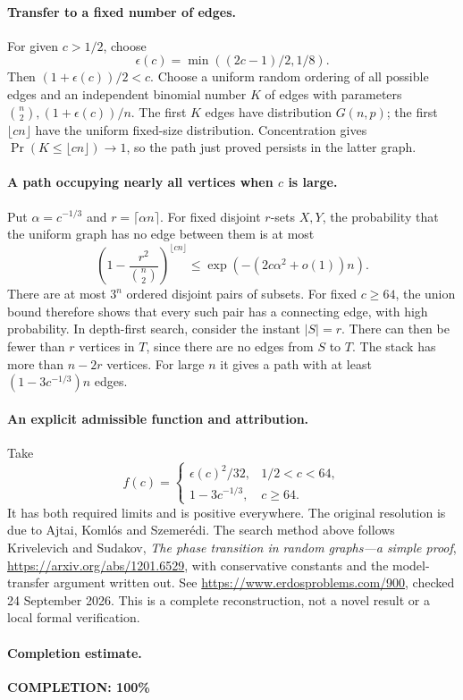 \paragraph{Transfer to a fixed number of edges.}
For given \(c>1/2\), choose
\[
 \epsilon(c)=\min((2c-1)/2,1/8).
\]
Then \((1+\epsilon(c))/2<c\).
Choose a uniform random ordering of all possible edges
and an independent binomial number \(K\) of edges with
parameters \(\binom n2,(1+\epsilon(c))/n\).
The first \(K\) edges have distribution \(G(n,p)\);
the first \(\lfloor cn\rfloor\) have the uniform fixed-size
distribution. Concentration gives
\(\Pr(K\leq\lfloor cn\rfloor)\to1\), so the path just proved
persists in the latter graph.

\paragraph{A path occupying nearly all vertices when \(c\) is large.}
Put \(\alpha=c^{-1/3}\) and \(r=\lceil\alpha n\rceil\).
For fixed disjoint \(r\)-sets \(X,Y\), the probability that
the uniform graph has no edge between them is at most
\[
 \left(1-\frac{r^2}{\binom n2}\right)^{\lfloor cn\rfloor}
 \leq \exp(-(2c\alpha^2+o(1))n).
\]
There are at most \(3^n\) ordered disjoint pairs of subsets.
For fixed \(c\geq64\), the union bound therefore shows that
every such pair has a connecting edge, with high probability.
In depth-first search, consider the instant \(|S|=r\).
There can then be fewer than \(r\) vertices in \(T\), since
there are no edges from \(S\) to \(T\).
The stack has more than \(n-2r\) vertices. For large \(n\)
it gives a path with at least \((1-3c^{-1/3})n\) edges.

\paragraph{An explicit admissible function and attribution.}
Take
\[
 f(c)=
 \begin{cases}
  \epsilon(c)^2/32,&1/2<c<64,\\
  1-3c^{-1/3},&c\geq64.
 \end{cases}
\]
It has both required limits and is positive everywhere.
The original resolution is due to Ajtai, Koml\'os and
Szemer\'edi. The search method above follows Krivelevich
and Sudakov, \emph{The phase transition in random graphs---a
simple proof}, \url{https://arxiv.org/abs/1201.6529},
with conservative constants and the model-transfer argument
written out. See \url{https://www.erdosproblems.com/900},
checked 24 September 2026. This is a complete reconstruction,
not a novel result or a local formal verification.

\paragraph{Completion estimate.}
\textbf{COMPLETION: 100\%}
